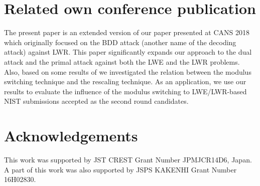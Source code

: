 \documentclass{cta-author}
\begin{document}
\section{Related own conference publication}
The present paper is an extended version of our paper presented at CANS 2018 \cite{LMDY18} which originally focused on the BDD attack (another name of the decoding attack) against LWR. This paper significantly expands our approach to the dual attack and the primal attack against both the LWE and the LWR problems. Also, based on some results of \cite{LMDY18} we investigated the relation between the modulus switching technique and the rescaling technique.  As an application, we use our results to evaluate the influence of the modulus switching to LWE/LWR-based NIST submissions accepted as the second round candidates.

\section{Acknowledgements} This work was supported by JST CREST Grant Number JPMJCR14D6, Japan. A part of this work was also supported by JSPS KAKENHI Grant Number 16H02830. 




\medskip



\end{document}
